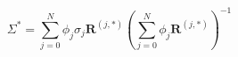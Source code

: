     \begin{equation}
        \Sigma^* = \sum_{j=0}^N \phi_j\sigma_j\mathbf{R}^{(j, \ast)} \left(\sum_{j=0}^N \phi_j\mathbf{R}^{(j,\ast)}\right)^{-1}
    \label{eq:emt_solving_b}
    \end{equation}
